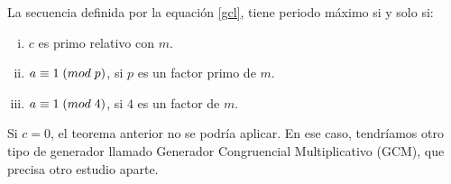 \begin{theorem}
La secuencia definida por la equación \eqref{gcl}, tiene periodo máximo si y solo si:
\begin{enumerate}[(i)]
\item $c$ es primo relativo con $m$.
\item $a \equiv 1 \;(mod \; p)$, si $p$ es un factor primo de $m$.
\item $a \equiv 1 \;(mod \; 4)$, si $4$ es un factor de $m$.
\end{enumerate}
\end{theorem}

\begin{remark}
Si $c=0$, el teorema anterior no se podría aplicar. En ese caso, tendríamos otro tipo de generador llamado Generador Congruencial Multiplicativo (GCM), que precisa otro estudio aparte.
\end{remark}

